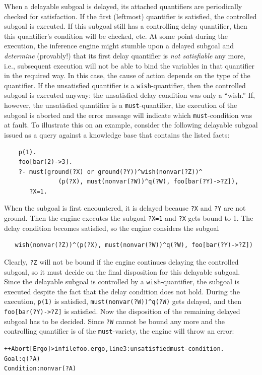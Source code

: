 \documentclass[11pt]{article}
\newcommand{\errorsystem}{Ergo}
\newcommand{\ergoext}{ergo\xspace}
\begin{document}
When a delayable subgoal is delayed, its attached quantifiers are
periodically checked for satisfaction. If the first (leftmost) quantifier
is satisfied, the controlled subgoal is executed. If this subgoal still has
a controlling delay quantifier, then this quantifier's condition will be
checked, etc.  At some point during the execution, the inference engine
might stumble upon a delayed subgoal and \emph{determine} (provably!)  that
its first delay quantifier is \emph{not satisfiable} any more, i.e.,
subsequent execution will not be able to bind the variables in that
quantifier in the required way.  In this case, the cause of action depends
on the type of the quantifier.  If the unsatisfied quantifier is a
\texttt{wish}-quantifier, then the controlled subgoal is executed anyway:
the unsatisfied delay condition was only a ``wish.'' If, however, the
unsatisfied quantifier is a \texttt{must}-quantifier, the execution of the
subgoal is aborted and the error message will indicate which
\texttt{must}-condition was at fault.  To illustrate this on an example,
consider the following delayable subgoal issued as a query against a
knowledge base that contains the listed facts:
\begin{verbatim}
    p(1).
    foo[bar(2)->3].
    ?- must(ground(?X) or ground(?Y))^wish(nonvar(?Z))^
               (p(?X), must(nonvar(?W))^q(?W), foo[bar(?Y)->?Z]),
       ?X=1.
\end{verbatim}
When the subgoal is first encountered, it is delayed because \texttt{?X}
and \texttt{?Y} are not ground. Then the engine executes the subgoal
\texttt{?X=1} and \texttt{?X} gets bound to 1. The
delay condition becomes satisfied, so the engine considers the subgoal
\begin{verbatim}
   wish(nonvar(?Z))^(p(?X), must(nonvar(?W))^q(?W), foo[bar(?Y)->?Z])
\end{verbatim}
Clearly, \texttt{?Z} will not be bound if the engine continues delaying the
controlled subgoal, so it must decide on the final disposition for this
delayable subgoal. Since the delayable subgoal
is controlled by a \texttt{wish}-quantifier,
the subgoal is executed despite the fact that the delay condition does not
hold. During the execution, \texttt{p(1)} is
satisfied, \texttt{must(nonvar(?W))\^{}q(?W)} gets delayed, and then
\texttt{foo[bar(?Y)->?Z]} is satisfied. 
Now the disposition of the remaining delayed subgoal has to be decided.
Since \texttt{?W} cannot be bound any more and the controlling quantifier
is of the \texttt{must}-variety, the engine will throw an error:
\begin{alltt}
++Abort[\errorsystem]> in file foo.\ergoext, line 3: unsatisfied must-condition.
	Goal: q(?A)
	Condition: nonvar(?A)
\end{alltt}
\end{document}
